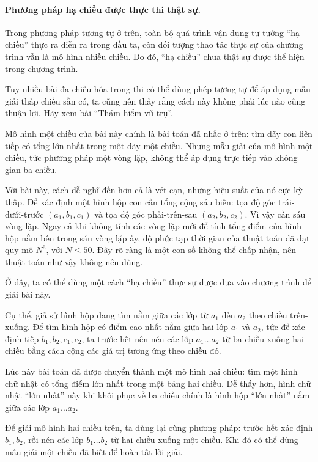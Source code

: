 \documentclass[11pt]{article}
\begin{document}
\paragraph{Phương pháp hạ chiều được thực thi thật sự.}
Trong phương pháp tương tự ở trên, toàn bộ quá trình vận dụng tư tưởng
``hạ chiều'' thực ra diễn ra trong đầu ta, còn đối tượng thao tác thực sự của
chương trình vẫn là mô hình nhiều chiều. Do đó, ``hạ chiều'' chưa thật sự
được thể hiện trong chương trình.

Tuy nhiều bài đa chiều hóa trong thi có thể dùng phép tương tự để áp dụng mẫu
giải thấp chiều sẵn có, ta cũng nên thấy rằng cách này không phải lúc nào
cũng thuận lợi. Hãy xem bài ``Thám hiểm vũ trụ''.

Mô hình một chiều của bài này chính là bài toán đã nhắc ở trên: tìm dãy con
liên tiếp có tổng lớn nhất trong một dãy một chiều. Nhưng mẫu giải của mô
hình một chiều, tức phương pháp một vòng lặp, không thể áp dụng trực tiếp vào
không gian ba chiều.

Với bài này, cách dễ nghĩ đến hơn cả là vét cạn, nhưng hiệu suất của nó cực
kỳ thấp. Để xác định một hình hộp con cần tổng cộng sáu biến: tọa độ góc
trái-dưới-trước \((a_1,b_1,c_1)\) và tọa độ góc phải-trên-sau
\((a_2,b_2,c_2)\). Vì vậy cần sáu vòng lặp. Ngay cả khi không tính các vòng
lặp mới để tính tổng điểm của hình hộp nằm bên trong sáu vòng lặp ấy, độ phức
tạp thời gian của thuật toán đã đạt quy mô \(N^6\), với \(N\le 50\). Đây rõ
ràng là một con số không thể chấp nhận, nên thuật toán như vậy không nên
dùng.

Ở đây, ta có thể dùng một cách ``hạ chiều'' thực sự được đưa vào chương trình
để giải bài này.

Cụ thể, giả sử hình hộp đang tìm nằm giữa các lớp từ \(a_1\) đến \(a_2\) theo
chiều trên-xuống. Để tìm hình hộp có điểm cao nhất nằm giữa hai lớp
\(a_1\) và \(a_2\), tức để xác định tiếp \(b_1,b_2,c_1,c_2\), ta trước hết
nên nén các lớp \(a_1\ldots a_2\) từ ba chiều xuống hai chiều bằng cách cộng
các giá trị tương ứng theo chiều đó.

Lúc này bài toán đã được chuyển thành một mô hình hai chiều: tìm một hình chữ
nhật có tổng điểm lớn nhất trong một bảng hai chiều. Dễ thấy hơn, hình chữ
nhật ``lớn nhất'' này khi khôi phục về ba chiều chính là hình hộp ``lớn
nhất'' nằm giữa các lớp \(a_1\ldots a_2\).

Để giải mô hình hai chiều trên, ta dùng lại cùng phương pháp: trước hết xác
định \(b_1,b_2\), rồi nén các lớp \(b_1\ldots b_2\) từ hai chiều xuống một
chiều. Khi đó có thể dùng mẫu giải một chiều đã biết để hoàn tất lời giải.
\end{document}
